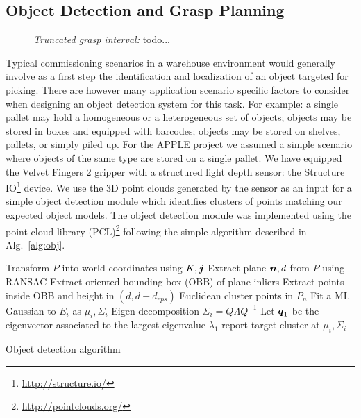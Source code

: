 \subsection{Object Detection and Grasp Planning}
\label{subsec:obj_det}
%
\begin{figure}[t!] 
   \centering
     
    \caption{\textit{Truncated grasp interval:} todo...}
   \label{fig:truncated_grasp_interval}
\end{figure}
%
Typical commissioning scenarios in a warehouse environment would generally involve as a first step
the identification and localization of an object targeted for picking.  There are however many
application scenario specific factors to consider when designing an object detection system for this
task.  For example: a single pallet may hold a homogeneous or a heterogeneous set of objects;
objects may be stored in boxes and equipped with barcodes; objects may be stored on shelves,
pallets, or simply piled up.  For the APPLE project we assumed a simple scenario where objects of
the same type are stored on a single pallet.  We have equipped the Velvet Fingers 2 gripper with a
structured light depth sensor: the Structure IO\footnote{\url{http://structure.io/}} device.  We use
the 3D point clouds generated by the sensor as an input for a simple object detection module which
identifies clusters of points matching our expected object models.  The object detection module was
implemented using the point cloud library (PCL)\footnote{\url{http://pointclouds.org/}} following
the simple algorithm described in Alg.~\ref{alg:obj}.
%
\begin{algorithm}[tbh]
{}
Transform $P$ into world coordinates using $K,\mbox{\boldmath $j$}$\;
 {
    Extract plane $\mbox{\boldmath $n$},d$ from $P$ using RANSAC\;
}
Extract oriented bounding box (OBB) of plane inliers\;
Extract points inside OBB and height in $(d,d+d_{eps})$\;
Euclidean cluster points in $P_n$\;
 {
    Fit a ML Gaussian to $E_i$ as $\mu_i,\Sigma_i$\;
    Eigen decomposition $\Sigma_i=Q\Lambda Q^{-1}$\;
    Let $\mbox{\boldmath $q$}_1$ be the eigenvector associated to the largest eigenvalue $\lambda_1$\;
     {report target cluster at $\mu_i,\Sigma_i$\;}
}
\caption{Object detection algorithm}\label{alg:obj}
\end{algorithm}
